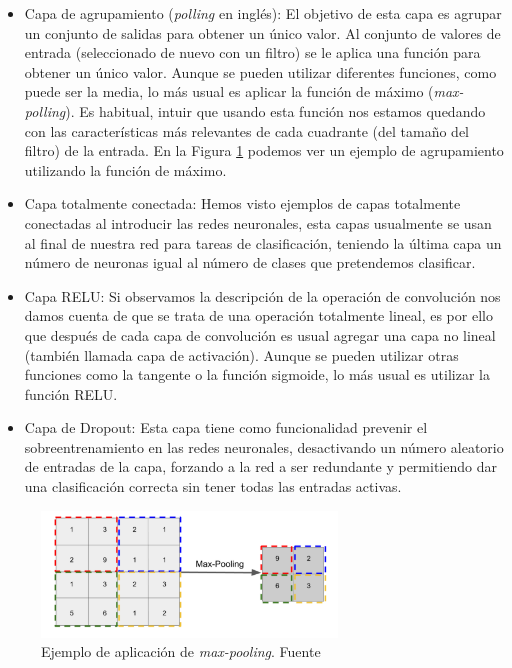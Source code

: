 \begin{itemize}
	\item Capa de agrupamiento (\textit{polling} en inglés): El objetivo de esta capa es agrupar un conjunto de salidas para obtener un único valor. Al conjunto de valores de entrada (seleccionado de nuevo con un filtro) se le aplica una función para obtener un único valor. Aunque se pueden utilizar diferentes funciones, como puede ser la media, lo más usual es aplicar la función de máximo (\textit{max-polling}). Es habitual, intuir que usando esta función nos estamos quedando con las características más relevantes de cada cuadrante (del tamaño del filtro) de la entrada. En la Figura \ref{fig:pooling} podemos ver un ejemplo de agrupamiento utilizando la función de máximo. 
	\item Capa totalmente conectada: Hemos visto ejemplos de capas totalmente conectadas al introducir las redes neuronales, esta capas usualmente se usan al final de nuestra red para tareas de clasificación, teniendo la última capa un número de neuronas igual al número de clases que pretendemos clasificar. 
	\item Capa RELU: Si observamos la descripción de la operación de convolución nos damos cuenta de que se trata de una operación totalmente lineal, es por ello que después de cada capa de convolución es usual agregar una capa no lineal (también llamada capa de activación). Aunque se pueden utilizar otras funciones como la tangente o la función sigmoide, lo más usual es utilizar la función RELU.
	
	\item Capa de Dropout: Esta capa tiene como funcionalidad prevenir el sobreentrenamiento en las redes neuronales, desactivando un número aleatorio de entradas de la capa, forzando a la red a ser redundante y permitiendo dar una clasificación correcta sin tener todas las entradas activas. 
	
\end{itemize}

\begin{figure}[!ht]
	\centering
	\includegraphics[width=0.7\textwidth]{images/arte/pooling}
	\caption{Ejemplo de aplicación de \textit{max-pooling}. Fuente \cite{temariodeeplearning}}
	\label{fig:pooling}
\end{figure}


